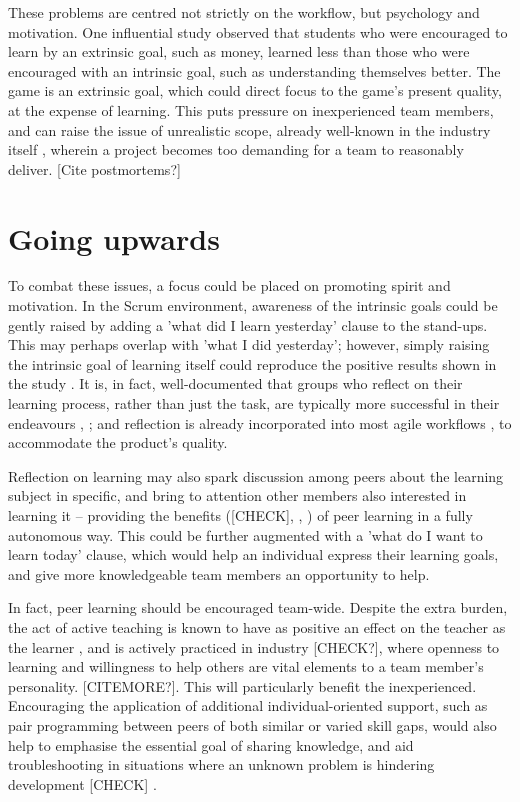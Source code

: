 \documentclass{scrartcl}
\begin{document}
These problems are centred not strictly on the workflow, but psychology and motivation. One influential study \cite{motivation} observed that students who were encouraged to learn by an extrinsic goal, such as money, learned less than those who were encouraged with an intrinsic goal, such as understanding themselves better. The game is an extrinsic goal, which could direct focus to the game's present quality, at the expense of learning. This puts pressure on inexperienced team members, and can raise the issue of unrealistic scope, already well-known in the industry itself \cite{problems}, wherein a project becomes too demanding for a team to reasonably deliver. [Cite postmortems?]

\section{Going upwards}
To combat these issues, a focus could be placed on promoting spirit and motivation. In the Scrum environment, awareness of the intrinsic goals could be gently raised by adding a 'what did I learn yesterday' clause to the stand-ups. This may perhaps overlap with 'what I did yesterday'; however, simply raising the intrinsic goal of learning itself could reproduce the positive results shown in the study \cite{motivation}. It is, in fact, well-documented that groups who reflect on their learning process, rather than just the task, are typically more successful in their endeavours \cite{effectivegroups}, \cite{learnreflection}; and reflection is already incorporated into most agile workflows \cite{agile}, \cite{scrum} to accommodate the product's quality.

Reflection on learning may also spark discussion among peers about the learning subject in specific, and bring to attention other members also interested in learning it -- providing the benefits (\cite{collaboration}[CHECK], \cite{motivation}, \cite{group2005}) of peer learning in a fully autonomous way. This could be further augmented with a 'what do I want to learn today' clause, which would help an individual express their learning goals, and give more knowledgeable team members an opportunity to help.

In fact, peer learning should be encouraged team-wide. Despite the extra burden, the act of active teaching is known to have as positive an effect on the teacher as the learner \cite{activepassive}, and is actively practiced in industry \cite{devstudy}[CHECK?], where openness to learning \cite{devstudy} and willingness to help others \cite{collaboration} are vital elements to a team member's personality. [CITEMORE?]. This will particularly benefit the inexperienced. Encouraging the application of additional individual-oriented support, such as pair programming between peers of both similar or varied skill gaps, would also help to emphasise the essential goal of sharing knowledge, and aid troubleshooting in situations where an unknown problem is hindering development \cite{collaboration} [CHECK] \cite{motivation} \cite{devstudy}.
\end{document}
